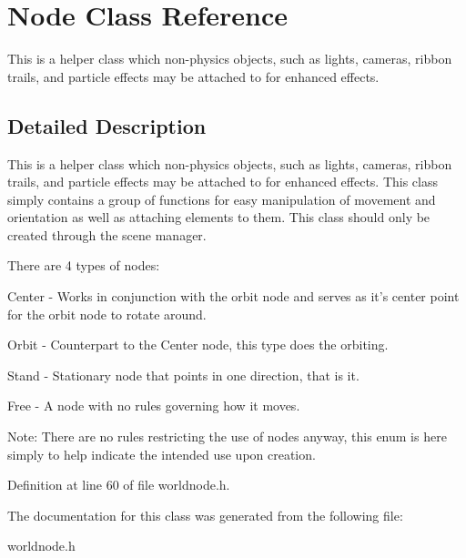 \hypertarget{classNode}{
\section{Node Class Reference}
\label{df/dd0/classNode}
}


This is a helper class which non-\/physics objects, such as lights, cameras, ribbon trails, and particle effects may be attached to for enhanced effects.  




\subsection{Detailed Description}
This is a helper class which non-\/physics objects, such as lights, cameras, ribbon trails, and particle effects may be attached to for enhanced effects. This class simply contains a group of functions for easy manipulation of movement and orientation as well as attaching elements to them. This class should only be created through the scene manager. \par
 There are 4 types of nodes: \par
 Center -\/ Works in conjunction with the orbit node and serves as it's center point for the orbit node to rotate around. \par
 Orbit -\/ Counterpart to the Center node, this type does the orbiting. \par
 Stand -\/ Stationary node that points in one direction, that is it. \par
 Free -\/ A node with no rules governing how it moves. \par
 Note: There are no rules restricting the use of nodes anyway, this enum is here simply to help indicate the intended use upon creation. 

Definition at line 60 of file worldnode.h.



The documentation for this class was generated from the following file:\begin{DoxyCompactItemize}
\item 
worldnode.h\end{DoxyCompactItemize}
